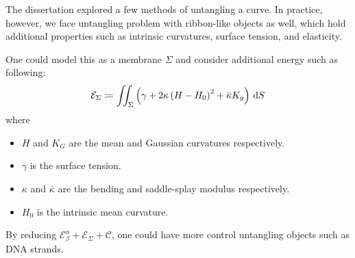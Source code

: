 \documentclass[../dissertation.tex]{subfiles}
\begin{document}
The dissertation explored a few methods of untangling a curve.
In practice, however, we face untangling problem with ribbon-like objects as well,
which hold additional properties such as intrinsic curvatures, surface tension, and elasticity.

One could model this as a membrane $\Sigma$ and consider additional energy such as following\cite{mmb}:
\begin{equation}
    \mathcal{E}_{\Sigma} \coloneqq \iint_{\Sigma} \left( \gamma + 2 \kappa \left( H-H_0 \right)^2 + \bar \kappa K_g \right) \, \text{d} S
\end{equation}
where
\begin{itemize}
    \item $H$ and $K_G$ are the mean and Gaussian curvatures respectively.
    \item $\gamma$ is the surface tension.
    \item $\kappa$ and $\bar \kappa$ are the bending and saddle-splay modulus respectively.
    \item $H_0$ is the intrinsic mean curvature.
\end{itemize}
By reducing $\mathcal{E}_{\beta}^{\alpha} + \mathcal{E}_{\Sigma} + \mathcal{C}$, one could have more control untangling objects such as DNA strands.
\end{document}

